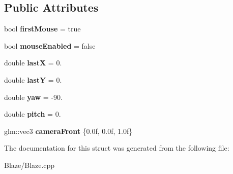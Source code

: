 \subsection*{Public Attributes}
\begin{DoxyCompactItemize}
\item 
\mbox{\label{structblaze_1_1CameraControlInfo_a137d82b792a788f8a2ac379a7ddaef39}} 
bool {\bfseries first\+Mouse} = true
\item 
\mbox{\label{structblaze_1_1CameraControlInfo_a2164d2d3802c03ff146f81d2a9c090d5}} 
bool {\bfseries mouse\+Enabled} = false
\item 
\mbox{\label{structblaze_1_1CameraControlInfo_a23d38b6cc81c927d4c62efefbc8c1aa1}} 
double {\bfseries lastX} = 0.
\item 
\mbox{\label{structblaze_1_1CameraControlInfo_aed54a7281c7f77842eb5f8bf12ec2fc4}} 
double {\bfseries lastY} = 0.
\item 
\mbox{\label{structblaze_1_1CameraControlInfo_a2ea8646a0d66c88526216f3c4d922fb6}} 
double {\bfseries yaw} = -\/90.
\item 
\mbox{\label{structblaze_1_1CameraControlInfo_a332de77133bf2a7de60035a12809e098}} 
double {\bfseries pitch} = 0.
\item 
\mbox{\label{structblaze_1_1CameraControlInfo_ad5cc0f1058f237c34b904d46e5fd229b}} 
glm\+::vec3 {\bfseries camera\+Front} \{0.\+0f, 0.\+0f, 1.\+0f\}
\end{DoxyCompactItemize}


The documentation for this struct was generated from the following file\+:\begin{DoxyCompactItemize}
\item 
Blaze/Blaze.\+cpp\end{DoxyCompactItemize}
